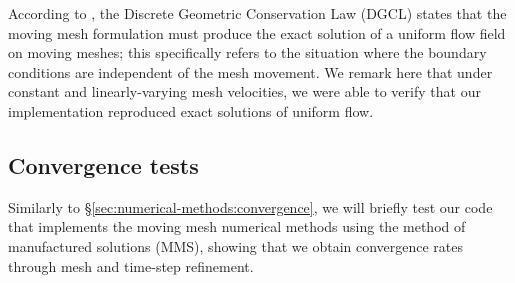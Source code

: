         According to \citeauthor{nobileStabilityAnalysisArbitrary1999} \cite{nobileStabilityAnalysisArbitrary1999}, the Discrete Geometric Conservation Law (DGCL) states that the moving mesh formulation must produce the exact solution of a uniform flow field on moving meshes; this specifically refers to the situation where the boundary conditions are independent of the mesh movement. We remark here that under constant and linearly-varying mesh velocities, we were able to verify that our implementation reproduced exact solutions of uniform flow.

        \subsection{Convergence tests} \label{sec:contractions:numerical-experiments:convergence}
        
            Similarly to \S\ref{sec:numerical-methods:convergence}, we will briefly test our code that implements the moving mesh numerical methods using the method of manufactured solutions (MMS), showing that we obtain convergence rates through mesh and time-step refinement.

